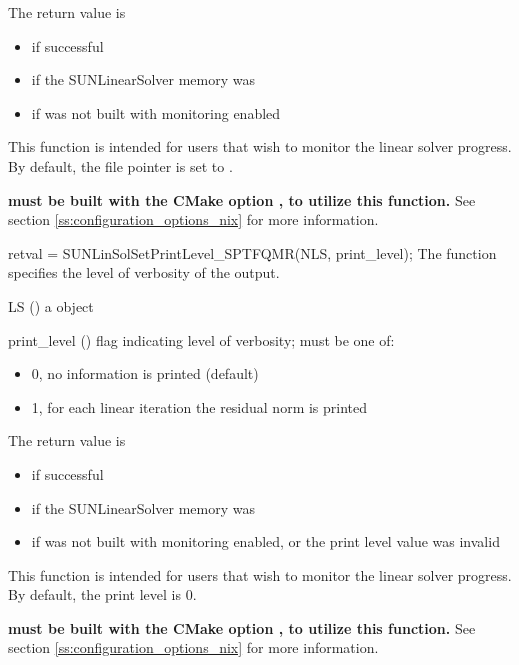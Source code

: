 {
  The return value is
  \begin{itemize}
    \item {} if successful
    \item {} if the SUNLinearSolver memory was 
    \item {} if {\sundials} was not built with monitoring enabled
  \end{itemize}
}
{
  This function is intended for users that wish to monitor the linear
  solver progress. By default, the file pointer is set to .

  \textbf{{\sundials} must be built with the CMake option
  , to utilize this function.}
  See section \ref{ss:configuration_options_nix} for more information.
}
%
%
{
  retval = SUNLinSolSetPrintLevel\_SPTFQMR(NLS, print\_level);
}
{
  The function  specifies the level
  of verbosity of the output.
}
{
  \begin{args}
  \item[LS] ()
    a {\sunnonlinsol} object
  \item[print\_level] () flag indicating level of verbosity;
    must be one of:
    \begin{itemize}
      \item 0, no information is printed (default)
      \item 1, for each linear iteration the residual norm is printed
    \end{itemize}
  \end{args}
}
{
  The return value is
  \begin{itemize}
    \item {} if successful
    \item {} if the SUNLinearSolver memory was 
    \item {} if {\sundials} was not built with monitoring enabled,
      or the print level value was invalid
  \end{itemize}
}
{
  This function is intended for users that wish to monitor the linear
  solver progress. By default, the print level is 0.

  \textbf{{\sundials} must be built with the CMake option
  , to utilize this function.}
  See section \ref{ss:configuration_options_nix} for more information.
}


